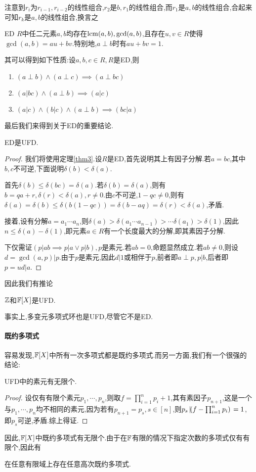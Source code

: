 \documentclass[openany]{book}
\begin{document}
注意到$r_i$为$r_{i-1},r_{i-2}$的线性组合,$r_2$是$b,r_1$的线性组合,而$r_1$是$a,b$的线性组合,合起来可知$r_k$是$a,b$的线性组合,换言之
\begin{theorem}[B\'ezout引理]
    ED $R$中任二元素$a,b$均存在$\operatorname{lcm}(a,b),\gcd(a,b)$,且存在$u,v\in R$使得$\gcd(a,b)=au+bv$.特别地,$a\perp b$时有$au+bv=1$.
\end{theorem}
其可以得到如下性质:设$a,b,c\in R, R$是ED,则
\begin{enumerate}
    \item $(a\perp b)\land (a\perp c)\implies (a\perp bc)$
    \item $(a|bc)\land (a\perp b)\implies (a|c)$
    \item $(a|c)\land (b|c)\land (a\perp b)\implies (bc|a)$
\end{enumerate}
最后我们来得到关于ED的重要结论.
\begin{theorem}
    ED是UFD.
\end{theorem}
\begin{proof}
    我们将使用定理\ref{thm3}.设$R$是ED,首先说明其上有因子分解.若$a=bc$,其中$b,c$不可逆,下面说明$\delta(b)<\delta(a)$.

    首先$\delta(b)\leq \delta(bc)=\delta(a)$.若$\delta(b)=\delta(a)$,则有$b=qa+r, \delta(r)<\delta(a), r\neq 0$.由$c$不可逆,$1-qc\neq 0$,则有$\delta(a)=\delta(b)\leq \delta(b(1-qc))=\delta(b-aq)=\delta(r)<\delta(a)$,矛盾.

    接着,设有分解$a=a_1\cdots a_n$,则$\delta(a)>\delta(a_1\cdots a_{n-1})>\cdots \delta(a_1)>\delta(1)$,因此$n\leq \delta(a)-\delta(1)$,即元素$a\in R$有一个长度最大的分解,即其素因子分解.

    下仅需证$(p|ab\implies p|a\lor p|b), p$是素元.若$ab=0$,命题显然成立.若$ab\neq 0$,则设$d=\gcd(a,p)|p$.由于$p$是素元,因此$d|1$或相伴于$p$,前者即$a\perp p, p|b$,后者即$p=ud|a$.
\end{proof}
因此我们有推论
\begin{proposition}[算术基本定理]
    $\mathbb{Z}$和$\mathbb{F}[X]$是UFD.
\end{proposition}
事实上,多变元多项式环也是UFD,尽管它不是ED.%

\paragraph{既约多项式}容易发现,$\mathbb{F}[X]$中所有一次多项式都是既约多项式.而另一方面,我们有一个很强的结论:
\begin{theorem}
    UFD中的素元有无限个.
\end{theorem}
\begin{proof}
    设仅有有限个素元$p_1,\cdots,p_n$,则取$f=\prod_{i=1}^n p_i+1$,其有素因子$p_{n+1}$,这是一个与$p_1,\cdots,p_n$均不相同的素元,因为若有$p_{n+1}=p_s,s\in [n]$,则$p_s\left|\!\left(f-\prod_{i=1}^n p_i\right)\right.=1$,即$p_s$可逆,矛盾.综上得证.
\end{proof}
因此,$\mathbb{F}[X]$中既约多项式有无限个.由于在$\mathbb{F}$有限的情况下指定次数的多项式仅有有限个,因此有
\begin{proposition}
    在任意有限域上存在任意高次既约多项式.
\end{proposition}
\end{document}
